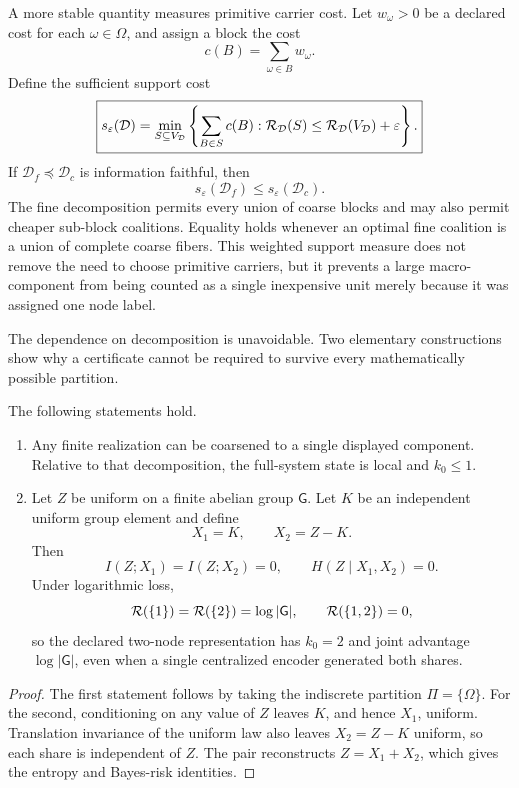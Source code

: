 A more stable quantity measures primitive carrier cost. Let
\(w_\omega>0\) be a declared cost for each \(\omega\in\Omega\), and assign a
block the cost
\[
c(B)=\sum_{\omega\in B}w_\omega.
\]
Define the sufficient support cost
\[
\boxed{
s_\varepsilon(\mathcal D)
=
\min_{S\subseteq V_{\mathcal D}}
\left\{
\sum_{B\in S}c(B):
\mathcal R_{\mathcal D}(S)
\leq
\mathcal R_{\mathcal D}(V_{\mathcal D})+\varepsilon
\right\}.
}
\]
If \(\mathcal D_f\preceq\mathcal D_c\) is information faithful, then
\[
\boxed{
s_\varepsilon(\mathcal D_f)
\leq
s_\varepsilon(\mathcal D_c).}
\]
The fine decomposition permits every union of coarse blocks and may also
permit cheaper sub-block coalitions. Equality holds whenever an optimal fine
coalition is a union of complete coarse fibers. This weighted support measure
does not remove the need to choose primitive carriers, but it prevents a
large macro-component from being counted as a single inexpensive unit merely
because it was assigned one node label.


The dependence on decomposition is unavoidable. Two elementary constructions
show why a certificate cannot be required to survive every mathematically
possible partition.

\begin{proposition}
\label{prop:decomposition-trivialization}
The following statements hold.
\begin{enumerate}
\item Any finite realization can be coarsened to a single displayed component.
 Relative to that decomposition, the full-system state is local and
 \(k_0\leq1\).
\item Let \(Z\) be uniform on a finite abelian group \(\mathsf G\). Let
 \(K\) be an independent uniform group element and define
 \[
 X_1=K,
 \qquad
 X_2=Z-K.
 \]
 Then
 \[
 I(Z;X_1)=I(Z;X_2)=0,
 \qquad
 H(Z\mid X_1,X_2)=0.
 \]
 Under logarithmic loss,
 \[
 \mathcal R(\{1\})=\mathcal R(\{2\})=\log|\mathsf G|,
 \qquad
 \mathcal R(\{1,2\})=0,
 \]
 so the declared two-node representation has \(k_0=2\) and joint advantage
 \(\log|\mathsf G|\), even when a single centralized encoder generated both
 shares.
\end{enumerate}
\end{proposition}

\begin{proof}
The first statement follows by taking the indiscrete partition
\(\Pi=\{\Omega\}\). For the second, conditioning on any value of \(Z\) leaves
\(K\), and hence \(X_1\), uniform. Translation invariance of the uniform law
also leaves \(X_2=Z-K\) uniform, so each share is independent of \(Z\). The
pair reconstructs \(Z=X_1+X_2\), which gives the entropy and Bayes-risk
identities.
\end{proof}


